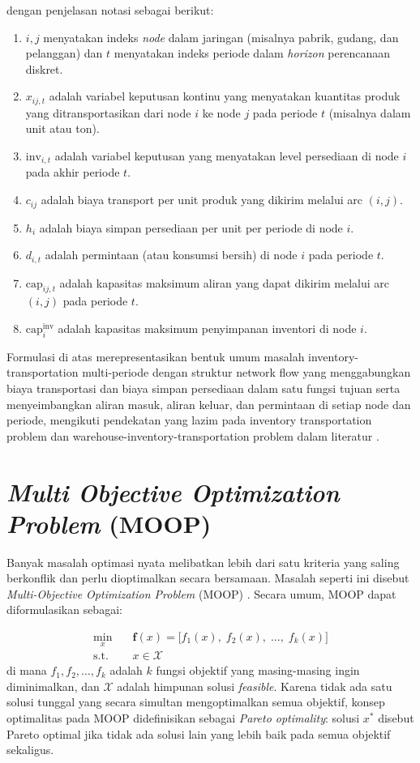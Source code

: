\documentclass{file/TA-ITS}
\theoremstyle{definition}
\theoremstyle{definition}
\theoremstyle{plain}
\begin{document}
dengan penjelasan notasi sebagai berikut:
\begin{enumerate}
    \item $i,j$ menyatakan indeks \textit{node} dalam jaringan (misalnya pabrik, gudang, dan pelanggan) dan $t$ menyatakan indeks periode dalam \textit{horizon} perencanaan diskret.
    \item $x_{ij,t}$ adalah variabel keputusan kontinu yang menyatakan kuantitas produk yang ditransportasikan dari node $i$ ke node $j$ pada periode $t$ (misalnya dalam unit atau ton).
    \item $\text{inv}_{i,t}$ adalah variabel keputusan yang menyatakan level persediaan di node $i$ pada akhir periode $t$.
    \item $c_{ij}$ adalah biaya transport per unit produk yang dikirim melalui arc $(i,j)$.
    \item $h_i$ adalah biaya simpan persediaan per unit per periode di node $i$.
    \item $d_{i,t}$ adalah permintaan (atau konsumsi bersih) di node $i$ pada periode $t$.
    \item $\text{cap}_{ij,t}$ adalah kapasitas maksimum aliran yang dapat dikirim melalui arc $(i,j)$ pada periode $t$.
    \item $\text{cap}^{\text{inv}}_{i}$ adalah kapasitas maksimum penyimpanan inventori di node $i$.
\end{enumerate}
Formulasi di atas merepresentasikan bentuk umum masalah inventory-transportation multi-periode dengan struktur network flow yang menggabungkan biaya transportasi dan biaya simpan persediaan dalam satu fungsi tujuan serta menyeimbangkan aliran masuk, aliran keluar, dan permintaan di setiap node dan periode, mengikuti pendekatan yang lazim pada inventory transportation problem dan warehouse-inventory-transportation problem dalam literatur \cite{SAINATHUNI2014690, DE2020107566}.


\section{\textit{Multi Objective Optimization Problem} (MOOP)}

Banyak masalah optimasi nyata melibatkan lebih dari satu kriteria yang saling berkonflik dan perlu dioptimalkan secara bersamaan. Masalah seperti ini disebut \textit{Multi-Objective Optimization Problem} (MOOP) \cite{MAVROTAS_MOOP, Miettinen_MOOP}. Secara umum, MOOP dapat diformulasikan sebagai:

\begin{align}
\label{eq:moop_general}
\min_x \quad & \mathbf{f}(x) = \bigl[f_1(x),\; f_2(x),\; \ldots,\; f_k(x)\bigr] \\
\text{s.t.} \quad & x \in \mathcal{X}
\end{align}
di mana $f_1, f_2, \ldots, f_k$ adalah $k$ fungsi objektif yang masing-masing ingin diminimalkan, dan $\mathcal{X}$ adalah himpunan solusi \textit{feasible}. Karena tidak ada satu solusi tunggal yang secara simultan mengoptimalkan semua objektif, konsep optimalitas pada MOOP didefinisikan sebagai \textit{Pareto optimality}: solusi $x^*$ disebut Pareto optimal jika tidak ada solusi lain yang lebih baik pada semua objektif sekaligus.
\end{document}
